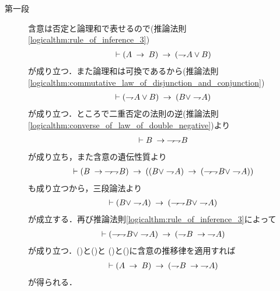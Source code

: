 	\begin{prf}\mbox{}
		\begin{description}
			\item[第一段]
				含意は否定と論理和で表せるので(推論法則\ref{logicalthm:rule_of_inference_3})
				\begin{align}
					\vdash (A \rarrow B) \rarrow (\negation A \vee B)
					\label{eq:thm_contraposition_is_true_1}
				\end{align}
				が成り立つ．また論理和は可換であるから(推論法則\ref{logicalthm:commutative_law_of_disjunction_and_conjunction})
				\begin{align}
					\vdash (\negation A \vee B) \rarrow (B \vee \negation A)
					\label{eq:thm_contraposition_is_true_2}
				\end{align}
				が成り立つ．ところで二重否定の法則の逆(推論法則\ref{logicalthm:converse_of_law_of_double_negative})より
				\begin{align}
					\vdash B \hspace{0.25em}\rightarrow\hspace{0.25em} \rightharpoondown\hspace{-0.25em} \rightharpoondown\hspace{-0.25em} B
				\end{align}
				が成り立ち，また含意の遺伝性質より
				\begin{align}
					\vdash (B \hspace{0.25em}\rightarrow\hspace{0.25em} \rightharpoondown\hspace{-0.25em} \rightharpoondown\hspace{-0.25em} B)
					\hspace{0.25em}\rightarrow\hspace{0.25em} ((B \vee \rightharpoondown\hspace{-0.25em} A) 
					\hspace{0.25em}\rightarrow\hspace{0.25em} (\rightharpoondown\hspace{-0.25em} \rightharpoondown\hspace{-0.25em} B \vee \rightharpoondown\hspace{-0.25em} A))
				\end{align}
				も成り立つから，三段論法より
				\begin{align}
					\vdash (B \vee \negation A) 
					\rarrow (\negation \negation B \vee \negation A)
					\label{eq:thm_contraposition_is_true_3}
				\end{align}
				が成立する．再び推論法則\ref{logicalthm:rule_of_inference_3}によって
				\begin{align}
					\vdash (\negation \negation B \vee \negation A)
					\rarrow (\negation B \rarrow \negation A)
					\label{eq:thm_contraposition_is_true_4}
				\end{align}
				が成り立つ．()と()と
				()と()に含意の推移律を適用すれば
				\begin{align}
					\vdash (A \hspace{0.25em}\rightarrow\hspace{0.25em} B) \hspace{0.25em}\rightarrow\hspace{0.25em} (\rightharpoondown\hspace{-0.25em} B \hspace{0.25em}\rightarrow\hspace{0.25em} \rightharpoondown\hspace{-0.25em} A)
				\end{align}
				が得られる．
				

\end{description}
\end{prf}
